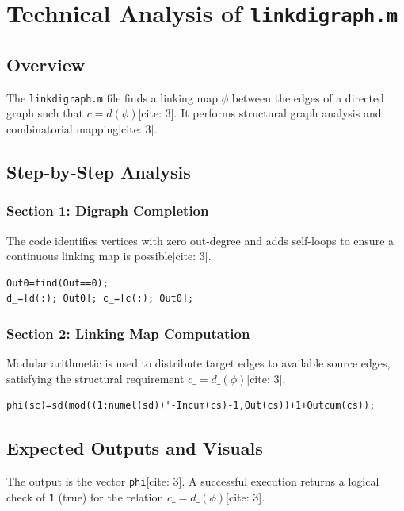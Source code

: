 
\chapter{Technical Analysis of \texttt{linkdigraph.m}}
\date{March 10, 2026}

\maketitle

\section{Overview}
The \texttt{linkdigraph.m} file finds a linking map $\phi$ between the edges of a directed graph such that $c = d(\phi)$[cite: 3]. It performs structural graph analysis and combinatorial mapping[cite: 3].

\section{Step-by-Step Analysis}

\subsection{Section 1: Digraph Completion}
The code identifies vertices with zero out-degree and adds self-loops to ensure a continuous linking map is possible[cite: 3].
\begin{lstlisting}
Out0=find(Out==0);
d_=[d(:); Out0]; c_=[c(:); Out0];
\end{lstlisting}

\subsection{Section 2: Linking Map Computation}
Modular arithmetic is used to distribute target edges to available source edges, satisfying the structural requirement $c\_ = d\_(\phi)$[cite: 3].
\begin{lstlisting}
phi(sc)=sd(mod((1:numel(sd))'-Incum(cs)-1,Out(cs))+1+Outcum(cs));
\end{lstlisting}

\section{Expected Outputs and Visuals}
The output is the vector \texttt{phi}[cite: 3]. A successful execution returns a logical check of \texttt{1} (true) for the relation $c\_ = d\_(\phi)$[cite: 3].
